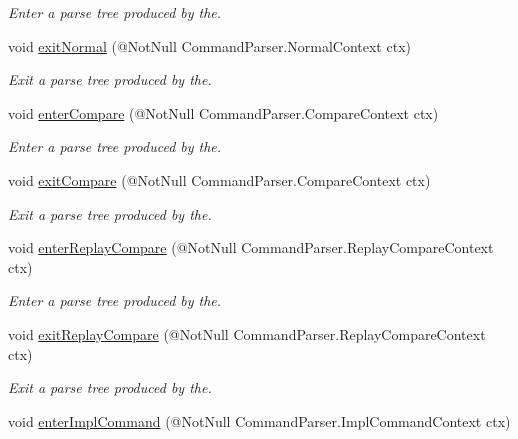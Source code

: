\begin{DoxyCompactItemize}
\begin{DoxyCompactList}\small\item\em Enter a parse tree produced by the. \end{DoxyCompactList}\item 
void \hyperlink{interfaceedu_1_1udel_1_1cis_1_1vsl_1_1civl_1_1run_1_1common_1_1CommandListener_a9000479ccc91b92b0a92d92e6948a764}{exit\+Normal} (@Not\+Null Command\+Parser.\+Normal\+Context ctx)
\begin{DoxyCompactList}\small\item\em Exit a parse tree produced by the. \end{DoxyCompactList}\item 
void \hyperlink{interfaceedu_1_1udel_1_1cis_1_1vsl_1_1civl_1_1run_1_1common_1_1CommandListener_a009a2c86aec3a82052d00574a017c99b}{enter\+Compare} (@Not\+Null Command\+Parser.\+Compare\+Context ctx)
\begin{DoxyCompactList}\small\item\em Enter a parse tree produced by the. \end{DoxyCompactList}\item 
void \hyperlink{interfaceedu_1_1udel_1_1cis_1_1vsl_1_1civl_1_1run_1_1common_1_1CommandListener_a6e7f3302596b24cc5341cc895a2d345a}{exit\+Compare} (@Not\+Null Command\+Parser.\+Compare\+Context ctx)
\begin{DoxyCompactList}\small\item\em Exit a parse tree produced by the. \end{DoxyCompactList}\item 
void \hyperlink{interfaceedu_1_1udel_1_1cis_1_1vsl_1_1civl_1_1run_1_1common_1_1CommandListener_a847efa4727f226c5372968260219ad58}{enter\+Replay\+Compare} (@Not\+Null Command\+Parser.\+Replay\+Compare\+Context ctx)
\begin{DoxyCompactList}\small\item\em Enter a parse tree produced by the. \end{DoxyCompactList}\item 
void \hyperlink{interfaceedu_1_1udel_1_1cis_1_1vsl_1_1civl_1_1run_1_1common_1_1CommandListener_a2c45a18674c2f001abc8030eedf1a326}{exit\+Replay\+Compare} (@Not\+Null Command\+Parser.\+Replay\+Compare\+Context ctx)
\begin{DoxyCompactList}\small\item\em Exit a parse tree produced by the. \end{DoxyCompactList}\item 
void \hyperlink{interfaceedu_1_1udel_1_1cis_1_1vsl_1_1civl_1_1run_1_1common_1_1CommandListener_a58e06658c972125c9e21d9fd87afe1db}{enter\+Impl\+Command} (@Not\+Null Command\+Parser.\+Impl\+Command\+Context ctx)

\end{DoxyCompactItemize}
